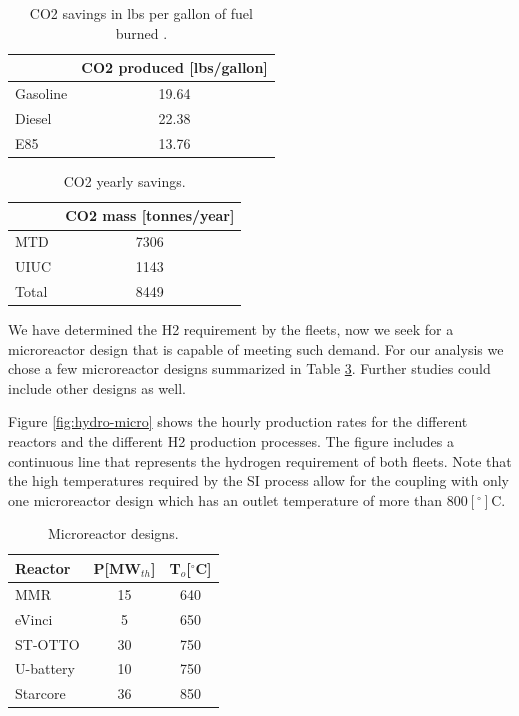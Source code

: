 \documentclass[11pt,letterpaper]{article}
\begin{document}
	\begin{table}[htbp!]
		\centering
	    \caption{\gls{CO2} savings in lbs per gallon of fuel burned \cite{energy_information_administration_how_2014}.}
		\begin{tabular}{l|c}
		\hline
		              & \gls{CO2} produced [lbs/gallon] \\ \hline
		Gasoline      & 19.64           \\
		Diesel        & 22.38           \\
		E85           & 13.76           \\ \hline
        \end{tabular}
        \label{tab:co2-eq}
	\end{table}

	\begin{table}[htbp!]
		\centering
	    \caption{\gls{CO2} yearly savings.}
		\begin{tabular}{l|c}
		\hline
		            & \gls{CO2} mass [tonnes/year] \\ \hline
		MTD      	  & 7306           \\
		UIUC        & 1143           \\
		Total       & 8449           \\ \hline
        \end{tabular}
        \label{tab:co2}
	\end{table}

We have determined the \gls{H2} requirement by the fleets, now we seek for a microreactor design that is capable of meeting such demand.
For our analysis we chose a few microreactor designs summarized in Table \ref{tab:hydro-micro}.
Further studies could include other designs as well.

Figure \ref{fig:hydro-micro} shows the hourly production rates for the different reactors and the different \gls{H2} production processes.
The figure includes a continuous line that represents the hydrogen requirement of both fleets.
Note that the high temperatures required by the \gls{SI} process allow for the coupling with only one microreactor design which has an outlet temperature of more than 800$[^{\circ}]$C.

	\begin{table}[htbp!]
		\centering
	    \caption{Microreactor designs.}
		\begin{tabular}{|lcc|}
		\hline
		Reactor                                      & P[MW$_{th}$] & T$_o$[$^\circ$C] \\ \hline
		MMR \cite{usnc_mmr_2019}  		               & 15           & 640              \\
		eVinci \cite{hernandez_micro_2019}           & 5            & 650              \\
		ST-OTTO \cite{harlan_x-energy_2018}          & 30           & 750              \\
		U-battery \cite{ding_design_2011}            & 10           & 750              \\
		Starcore \cite{star_core_nuclear_star_2015}  & 36           & 850              \\ \hline
        \end{tabular}
        \label{tab:hydro-micro}
	\end{table}
\end{document}
